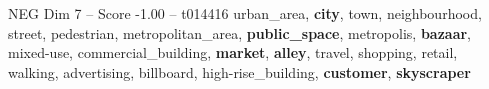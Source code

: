 \begin{textsample}{NEG Dim 7 – Score -1.00 – t014416}  \label{ex:f7_neg_004}
urban\_area, \textbf{city}, town, neighbourhood, street, pedestrian, metropolitan\_area, \textbf{public\_space}, metropolis, \textbf{bazaar}, mixed-use, commercial\_building, \textbf{market}, \textbf{alley}, travel, shopping, retail, walking, advertising, billboard, high-rise\_building, \textbf{customer}, \textbf{skyscraper}

\end{textsample}
